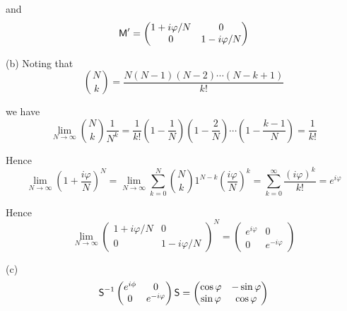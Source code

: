 and
\begin{equation*}
\textsf M'=\begin{pmatrix}
1+i\varphi/N & 0
\\
0 & 1-i\varphi/N
\end{pmatrix}
\end{equation*}

(b) Noting that
\begin{equation*}
\binom{N}{k}=\frac{N(N-1)(N-2)\cdots(N-k+1)}{k!}
\end{equation*}

we have
\begin{equation*}
\lim_{N\rightarrow\infty}
\binom{N}{k}\frac{1}{N^k}
=\frac{1}{k!}\left(1-\frac{1}{N}\right)\left(1-\frac{2}{N}\right)\cdots\left(1-\frac{k-1}{N}\right)
=\frac{1}{k!}
\end{equation*}

Hence
\begin{equation*}
\lim_{N\rightarrow\infty}\left(1+\frac{i\varphi}{N}\right)^N
=\lim_{N\rightarrow\infty}\sum_{k=0}^N\binom{N}{k}1^{N-k}\left(\frac{i\varphi}{N}\right)^k
=\sum_{k=0}^\infty\frac{(i\varphi)^k}{k!}
=e^{i\varphi}
\end{equation*}

Hence
\begin{equation*}
\lim_{N\rightarrow\infty}
\begin{pmatrix}
1+i\varphi/N & 0
\\
0 & 1-i\varphi/N
\end{pmatrix}^N
=
\begin{pmatrix}
e^{i\varphi} & 0
\\
0 & e^{-i\varphi}
\end{pmatrix}
\end{equation*}

(c)
\begin{equation*}
\textsf S^{-1}
\begin{pmatrix}
e^{i\phi} & 0
\\
0 & e^{-i\varphi}
\end{pmatrix}
\textsf S
=\begin{pmatrix}
\cos\varphi & -\sin\varphi
\\
\sin\varphi & \cos\varphi
\end{pmatrix}
\end{equation*}


